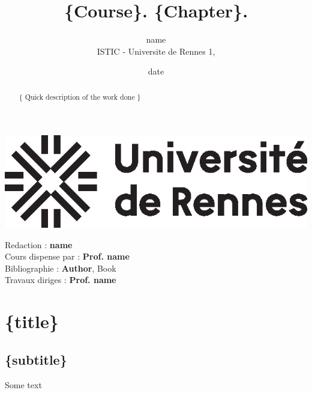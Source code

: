 \documentclass{config/homework}
\title{\fontfamily{phv}\selectfont \{Course\}. \{Chapter\}.}
\date{date}
\author{name \\ ISTIC - Universite de Rennes 1, \textit{\thedate}}
\begin{document}
    \begin{titlepage}

        \maketitle

        \begin{abstract}
            \{
            Quick description of the work done
            \}
        \end{abstract}
        \vspace{5em}
        \center\includegraphics{images/univ-logo}

        \newpage

        \tableofcontents

        \vspace{5em}

        \begin{contributors}
            \vspace{.25em}
            Redaction : \textbf{name} \\
            Cours dispense par : \textbf{Prof. name} \\
            Bibliographie : \textbf{Author}, Book\\
            Travaux diriges : \textbf{Prof. name} \\
            \vspace{.25em}
        \end{contributors}

    \end{titlepage}

    \section{\{title\}}\label{sec:section}

    \subsection{\{subtitle\}}\label{subsec:a}
    Some text
    \newpage
\end{document}
